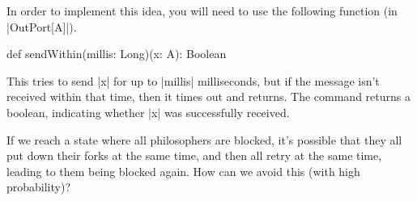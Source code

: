\documentclass[11pt,a4paper]{article}
\begin{document}
In order to implement
this idea, you will need to use the following function (in |OutPort[A]|).
\begin{scala}
  def sendWithin(millis: Long)(x: A): Boolean
\end{scala}
This tries to send |x| for up to |millis| milliseconds, but if the message
isn't received within that time, then it times out and returns.  The command
returns a boolean, indicating whether |x| was successfully received.  
 











If we reach a state where all philosophers are blocked, it's possible
that they all put down their forks at the same time, and then all
retry at the same time, leading to them being blocked again.  How can
we avoid this (with high probability)?





\end{document}
